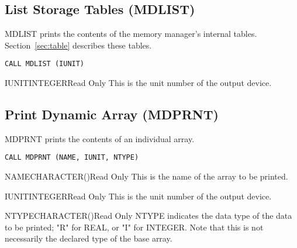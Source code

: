 \subsection{List Storage Tables (MDLIST)}
MDLIST prints the contents of the memory manager's internal tables.
Section~\ref{sec:table} describes these tables. 

\verb+CALL MDLIST (IUNIT)+

\begin{argy}{IUNIT}{INTEGER}{Read Only}
This is the unit number of the output device.
\end{argy}

\subsection{Print Dynamic Array (MDPRNT)}
MDPRNT prints the contents of an individual array.

\verb+CALL MDPRNT (NAME, IUNIT, NTYPE)+

\begin{argy}{NAME}{CHARACTER\last(\last)}{Read Only}
This is the name of the array to be printed.
\end{argy}

\begin{argy}{IUNIT}{INTEGER}{Read Only}
This is the unit number of the output device.
\end{argy}

\begin{argy}{NTYPE}{CHARACTER\last(\last)}{Read Only}
NTYPE indicates the data type of the data to be printed; "R" for REAL, or
"I" for INTEGER.  Note that this is not necessarily the declared type of the
base array. 
\end{argy}
